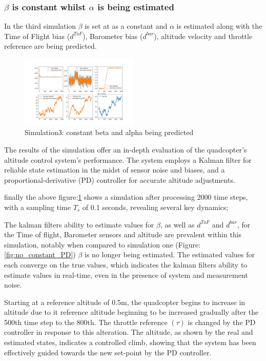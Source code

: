 \documentclass{article}
\begin{document}
\subsubsection*{\(\beta\) is constant whilst \(\alpha\) is being estimated}
In the third simulation \(\beta\) is set at as a constant and \(\alpha\) is estimated along with the Time of Flight bias (\(d^{ToF}\)), Barometer bias (\(d^{bar}\)), altitude velocity and throttle reference are being predicted.
\begin{figure}[H]
  \centering
  \includegraphics[width=0.5\textwidth]{Pictures/b_constant_PD.png}
  \caption{Simulation3: constant beta and alpha being predicted}
  \label{fig:b_constant_PD}
\end{figure}
The results of the simulation offer an in-depth evaluation of the quadcopter's altitude control system's performance. The system employs a Kalman filter for reliable state estimation in the midst of sensor noise and biases, and a proportional-derivative (PD) controller for accurate altitude adjustments.

finally the above figure:\ref{fig:b_constant_PD} shows a simulation after processing 2000 time steps, with a sampling time \(T_s\) of 0.1 seconds, revealing several key dynamics;

The kalman filters ability to estimate values for \(\beta\), as well as \(d^{ToF}\) and \(d^{bar}\), for the Time of flight, Barometer sensors and altitude are prevalent within this simulation, notably when compared to simulation one (Figure:\ref{fig:no_constant_PD}) \(\beta\) is no longer being estimated. The estimated values for each 
converge on the true values, which indicates the kalman filters ability to estimate values in real-time, even in the presence of system and measurement noise.

Starting at a reference altitude of 0.5m, the quadcopter begins to increase in altitude due to it reference altitude beginning to be increased gradually after the 500th time step to the 800th. The throttle reference \((\tau)\) is changed by the PD controller in response to this alteration. The altitude, as shown by the real 
and estimated states, indicates a controlled climb, showing that the system has been effectively guided towards the new set-point by the PD controller.
\end{document}
